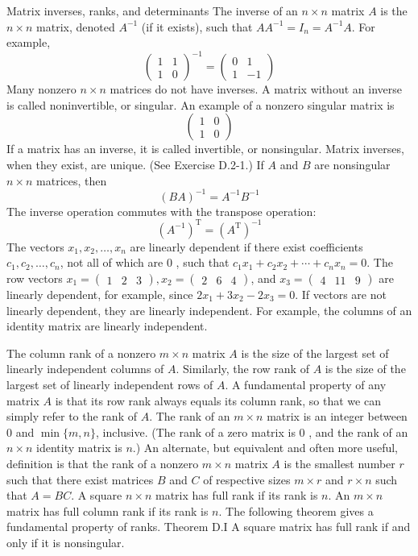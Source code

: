 \documentclass[lang=cn,newtx,10pt,scheme=chinese]{elegantbook}
\begin{document}
Matrix inverses, ranks, and determinants
The inverse of an $n \times n$ matrix $A$ is the $n \times n$ matrix, denoted $A^{-1}$ (if it exists), such that $A A^{-1}=I_n=A^{-1} A$. For example,
$$
\left(\begin{array}{ll}
1 & 1 \\
1 & 0
\end{array}\right)^{-1}=\left(\begin{array}{rr}
0 & 1 \\
1 & -1
\end{array}\right)
$$
Many nonzero $n \times n$ matrices do not have inverses. A matrix without an inverse is called noninvertible, or singular. An example of a nonzero singular matrix is
$$
\left(\begin{array}{ll}
1 & 0 \\
1 & 0
\end{array}\right)
$$
If a matrix has an inverse, it is called invertible, or nonsingular. Matrix inverses, when they exist, are unique. (See Exercise D.2-1.) If $A$ and $B$ are nonsingular $n \times n$ matrices, then
$$
(B A)^{-1}=A^{-1} B^{-1}
$$
The inverse operation commutes with the transpose operation:
$$
\left(A^{-1}\right)^{\mathrm{T}}=\left(A^{\mathrm{T}}\right)^{-1}
$$
The vectors $x_1, x_2, \ldots, x_n$ are linearly dependent if there exist coefficients $c_1, c_2, \ldots, c_n$, not all of which are 0 , such that $c_1 x_1+c_2 x_2+\cdots+c_n x_n=0$. The row vectors $x_1=\left(\begin{array}{lll}1 & 2 & 3\end{array}\right), x_2=\left(\begin{array}{lll}2 & 6 & 4\end{array}\right)$, and $x_3=\left(\begin{array}{lll}4 & 11 & 9\end{array}\right)$ are linearly dependent, for example, since $2 x_1+3 x_2-2 x_3=0$. If vectors are not linearly dependent, they are linearly independent. For example, the columns of an identity matrix are linearly independent.

The column rank of a nonzero $m \times n$ matrix $A$ is the size of the largest set of linearly independent columns of $A$. Similarly, the row rank of $A$ is the size of the largest set of linearly independent rows of $A$. A fundamental property of any matrix $A$ is that its row rank always equals its column rank, so that we can simply refer to the rank of $A$. The rank of an $m \times n$ matrix is an integer between 0 and $\min \{m, n\}$, inclusive. (The rank of a zero matrix is 0 , and the rank of an $n \times n$ identity matrix is $n$.) An alternate, but equivalent and often more useful, definition is that the rank of a nonzero $m \times n$ matrix $A$ is the smallest number $r$ such that there exist matrices $B$ and $C$ of respective sizes $m \times r$ and $r \times n$ such that $A=B C$. A square $n \times n$ matrix has full rank if its rank is $n$. An $m \times n$ matrix has full column rank if its rank is $n$. The following theorem gives a fundamental property of ranks.
Theorem D.I
A square matrix has full rank if and only if it is nonsingular.
\end{document}
